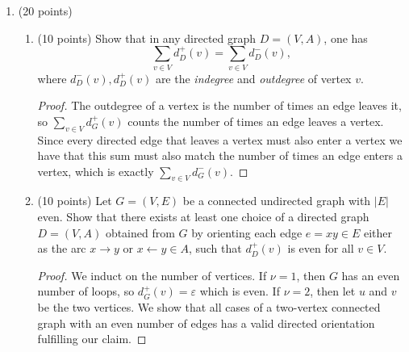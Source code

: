 \documentclass[11pt]{article}
\newcommand{\n}{\vspace{0.2cm}}
\begin{document}
\begin{enumerate}
      Now we show that there are always 12 pentagonal faces.
      \begin{proof}
        Let \(F\) denote the set of faces in \(G\), and \(f = |F|\).  Also let \(f_5 := |\{f \in F \mid d_G(f) = 5\}|\) be the number of pentagonal faces, and \(f_6 := |\{f \in F \mid d_G(f) = 6\}|\) be the number of hexagonal faces.  Applying theorem 1.1 and theorem 9.4, we see that
        \[3\nu = \sum_{v \in V}d_G(v) = 2\varepsilon = \sum_{v \in F} d_G(f) = 5f_5 + 6f_6,\]
        We can now use this result to rewrite Euler's formula in terms of both \(\nu\) and \(f = f_5+f_6\).
        \begin{align}
          -\frac12\nu + f_5 + f_6 &&=&& \nu - \frac32\nu + f_5 + f_6 &&=&& \nu - \varepsilon + f &&=&& 2 \\
          \nu - \frac32f_5 - 2f_6 &&=&& \nu - \frac52f_5 - 3f_6 + f_5 + f_6 &&=&& \nu - \varepsilon + f &&=&& 2
        \end{align}
        Finally if we add \(2 \cdot (1)\) onto \((2)\), we get \(\frac12f_5 = 6 \implies f_5 = 12\).
      \end{proof}
      


    \item (20 points)
      \begin{enumerate}
        \item (10 points) Show that in any directed graph \(D = (V,A)\), one has
          \[\sum_{v \in V} d_D^+(v) = \sum_{v \in V} d_D^-(v),\]
          where \(d_D^-(v), d_D^+(v)\) are the \textit{indegree} and \textit{outdegree} of vertex \(v\).
          \begin{proof}
            The outdegree of a vertex is the number of times an edge leaves it, so \(\sum_{v \in V} d_G^+(v)\) counts the number of times an edge leaves a vertex.  Since every directed edge that leaves a vertex must also enter a vertex we have that this sum must also match the number of times an edge enters a vertex, which is exactly \(\sum_{v \in V} d_G^-(v)\).
          \end{proof} \n

        \item (10 points) Let \(G = (V,E)\) be a connected undirected graph with \(|E|\) even.  Show that there exists at least one choice of a directed graph  \(D = (V,A)\) obtained from \(G\) by orienting each edge \(e = xy \in E\) either as the arc \(x \rightarrow y\) or \(x \leftarrow y \in A\), such that \(d_D^+(v)\) is even for all \(v \in V\).
          \begin{proof}
            We induct on the number of vertices.  If \(\nu = 1\), then \(G\) has an even number of loops, so \(d_G^+(v) = \varepsilon\) which is even.  If \(\nu = 2\), then let \(u\) and \(v\) be the two vertices.  We show that all cases of a two-vertex connected graph with an even number of edges has a valid directed orientation fulfilling our claim. \n


\end{proof}
\end{enumerate}
\end{enumerate}
\end{document}
